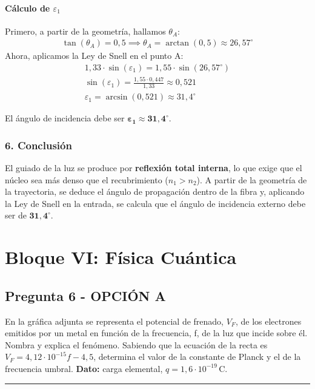 \paragraph*{Cálculo de $\varepsilon_1$}
Primero, a partir de la geometría, hallamos $\theta_A$:
\begin{gather}
    \tan(\theta_A) = 0,5 \implies \theta_A = \arctan(0,5) \approx 26,57^\circ
\end{gather}
Ahora, aplicamos la Ley de Snell en el punto A:
\begin{gather}
    1,33 \cdot \sin(\varepsilon_1) = 1,55 \cdot \sin(26,57^\circ) \nonumber \\[8pt]
    \sin(\varepsilon_1) = \frac{1,55 \cdot 0,447}{1,33} \approx 0,521 \nonumber \\[8pt]
    \varepsilon_1 = \arcsin(0,521) \approx 31,4^\circ
\end{gather}
\begin{cajaresultado}
    El ángulo de incidencia debe ser $\boldsymbol{\varepsilon_1 \approx 31,4^\circ}$.
\end{cajaresultado}

\subsubsection*{6. Conclusión}
\begin{cajaconclusion}
    El guiado de la luz se produce por \textbf{reflexión total interna}, lo que exige que el núcleo sea más denso que el recubrimiento ($n_1>n_2$). A partir de la geometría de la trayectoria, se deduce el ángulo de propagación dentro de la fibra y, aplicando la Ley de Snell en la entrada, se calcula que el ángulo de incidencia externo debe ser de $\mathbf{31,4^\circ}$.
\end{cajaconclusion}

\newpage

\section{Bloque VI: Física Cuántica}
\label{sec:cuantica_2025_jun_res}
\subsection{Pregunta 6 - OPCIÓN A}
\label{subsec:6A_2025_jun_res}

\begin{cajaenunciado}
En la gráfica adjunta se representa el potencial de frenado, $V_F$, de los electrones emitidos por un metal en función de la frecuencia, f, de la luz que incide sobre él. Nombra y explica el fenómeno. Sabiendo que la ecuación de la recta es $V_F = 4,12\cdot10^{-15}f - 4,5$, determina el valor de la constante de Planck y el de la frecuencia umbral.
\textbf{Dato:} carga elemental, $q=1,6\cdot10^{-19}\,\text{C}$.
\end{cajaenunciado}
\hrule

